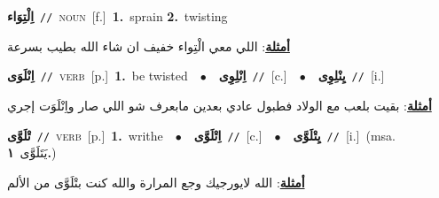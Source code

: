 \documentclass[10pt,a4paper,twoside]{article} %
\begin{document}
\begin{multicols}{2}
{\setlength\topsep{0pt}\textbf{\foreignlanguage{arabic}{اِلْتِوَاء}}\ {\color{gray}\texttt{//}\color{black}}\ \textsc{noun}\ [f.]\ \textbf{1.}~sprain  \textbf{2.}~twisting\  \begin{flushright}\color{gray}\foreignlanguage{arabic}{\textbf{\underline{\foreignlanguage{arabic}{أمثلة}}}: اللي معي الْتِواء خفيف ان شاء الله بطيب بسرعة}\end{flushright}\color{black}} \vspace{2mm}

{\setlength\topsep{0pt}\textbf{\foreignlanguage{arabic}{اِنْلَوَى}}\ {\color{gray}\texttt{//}\color{black}}\ \textsc{verb}\ [p.]\ \textbf{1.}~be twisted\ \ $\bullet$\ \ \setlength\topsep{0pt}\textbf{\foreignlanguage{arabic}{اِنْلِوِى}}\ {\color{gray}\texttt{//}\color{black}}\ [c.]\ \ $\bullet$\ \ \setlength\topsep{0pt}\textbf{\foreignlanguage{arabic}{يِنْلِوِى}}\ {\color{gray}\texttt{//}\color{black}}\ [i.]\  \begin{flushright}\color{gray}\foreignlanguage{arabic}{\textbf{\underline{\foreignlanguage{arabic}{أمثلة}}}: بقيت بلعب مع الولاد فطبول عادي بعدين مابعرف شو اللي صار واِنْلَوَت إجري}\end{flushright}\color{black}} \vspace{2mm}

{\setlength\topsep{0pt}\textbf{\foreignlanguage{arabic}{تْلَوَّى}}\ {\color{gray}\texttt{//}\color{black}}\ \textsc{verb}\ [p.]\ \textbf{1.}~writhe\ \ $\bullet$\ \ \setlength\topsep{0pt}\textbf{\foreignlanguage{arabic}{اِتْلَوَّى}}\ {\color{gray}\texttt{//}\color{black}}\ [c.]\ \ $\bullet$\ \ \setlength\topsep{0pt}\textbf{\foreignlanguage{arabic}{يِتْلَوَّى}}\ {\color{gray}\texttt{//}\color{black}}\ [i.]\ \color{gray}(msa. \foreignlanguage{arabic}{يَتَلَوَّى}~\foreignlanguage{arabic}{\textbf{١.}})\color{black}\  \begin{flushright}\color{gray}\foreignlanguage{arabic}{\textbf{\underline{\foreignlanguage{arabic}{أمثلة}}}: الله لايورجيك وجع المرارة والله كنت بتْلَوَّى من الألم}\end{flushright}\color{black}} \vspace{2mm}


\end{multicols}
\end{document}
